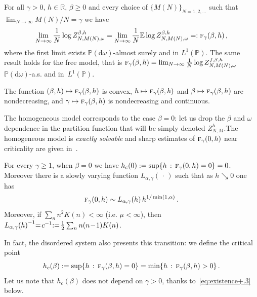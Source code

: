 \documentclass[AHL,Unicode,longabstracts]{cedram}
\newcommand{\ga}{\alpha}
\newcommand{\gb}{\beta}
\newcommand{\go}{\omega}
\newcommand{\dd}{\mathrm{d}}
\newcommand{\tf}{\textsc{f}} %
\newcommand{\bbE}{\ensuremath{\mathbb{E}}}
\newcommand{\bbP}{\ensuremath{\mathbb{P}}}
\newcommand{\bbR}{\ensuremath{\mathbb{R}}}
\newcommand*{\Mk}{\mkern -2mu}
\begin{document}
\begin{theo}\label{th:fq}
For all $\gamma>0$, $h \in \bbR$, $\beta \ge 0$ and every choice of $\{M(N)\}_{N=1,2, \ldots}$ such that $\lim_{N\to\infty} M(N)/N=\gamma$ we have
\begin{equation}\label{eq:saf}
\lim_{N\to\infty} \frac{1}{N} \log Z^{\gb,h}_{N,M(N),\omega} = \lim_{N\to\infty} \frac{1}{N} \bbE \log Z^{\gb,h}_{N,M(N),\omega} =: \tf_{\gamma}(\beta,h)\,,
\end{equation}
where the first limit exists $\bbP(\dd \go)$-almost surely and in $L^1(\bbP)$. The same result holds for the free model, that is $\tf_{\gamma}(\beta,h) = \lim_{N\to\infty} \frac{1}{N} \log Z^{f,\gb,h}_{N,M(N),\omega}$ $\bbP(\dd \go)$-a.s. and in~$L^1(\bbP)$.

The function $(\gb,h) \mapsto \tf_{\gamma}(\gb,h)$ is convex, $h\mapsto \tf_{\gamma}(\gb,h)$ and $\gb\mapsto \tf_{\gamma}(\gb,h)$ are nondecreasing, and $\gamma \mapsto \tf_{\gamma}(\gb,h)$ is nondecreasing and continuous.
\end{theo}

The homogeneous model corresponds to the case $\beta = 0$: let us drop the $\gb$ and $\go$ dependence in the partition function that will be simply denoted $Z_{N, M}^h$.\linebreak The homogeneous model is \emph{exactly solvable} and sharp estimates of $\tf_\gamma (0,h)$ near criticality are given in~\cite{cf:GK}.

\begin{theo}[\cite{cf:GK}]\label{th:beta0}
For every $\gamma \ge 1$, when $\beta=0$ we have $h_c(0) := \sup\{ h\,:\,\tf_{\gamma}(0,h)=0\}= 0$. Moreover there is a slowly varying function $L_{\ga, \gamma}({\,\cdot\,})$ such that as $h \searrow 0$ one has
\begin{equation}
\tf_\gamma (0,h) \sim L_{\ga,\gamma} (h)\,h^{1/ \min (1, \ga)}\,.
\end{equation}
Moreover, if $\sum_n n^2 K(n) \!<\! \infty$ (i.e. $\mu\!<\!\infty$), then ${L_{\ga,\gamma}(h)}^{-1} \Mk\!=\! c^{-1} \!\Mk:=\! \frac{1}{2} \sum_{n } n(n\!-\!1) K(n)$.
\end{theo}

In fact, the disordered system also presents this transition: we define the critical point
\begin{equation}
h_c(\beta) := \sup \lbrace h\,:\,\tf_\gamma (\beta,h) = 0 \rbrace = \min \lbrace h\,:\,\tf_\gamma (\beta,h) >0 \rbrace\,.
\end{equation}
Let us note that $h_c(\gb)$ does not depend on $\gamma >0$, thanks to~\eqref{eq:existence+.3} below.
\end{document}
